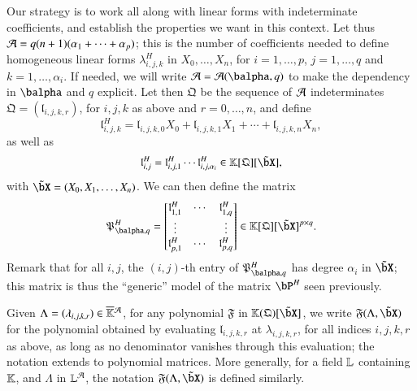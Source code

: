 \documentclass[amsthm]{elsart}
\begin{document}
Our strategy is to work all along with linear forms with indeterminate
coefficients, and establish the properties we want in this context.
Let thus ${\cal A}=q(n+1)(\alpha_1 + \cdots + \alpha_p)$; this is the
number of coefficients needed to define homogeneous linear forms
$\lambda^H_{i,j,k}$ in $X_0,\dots,X_n$, for $i=1,\dots,p$,
$j=1,\dots,q$ and $k=1,\dots,\alpha_i$. If needed, we will write
${\cal A}={\cal A}(\balpha,q)$ to make the dependency in $\balpha$ and
$q$ explicit.  Let then $\mathfrak{Q}$ be the sequence of ${\cal A}$
indeterminates $\mathfrak{Q}=(\mathfrak{l}_{i,j,k,r})$, for $i,j,k$ as
above and $r=0,\dots,n$, and define
$$\mathfrak{l}^H_{i,j,k} = \mathfrak{l}_{i,j,k,0}X_0 + \mathfrak{l}_{i,j,k,1} X_1 +\cdots + \mathfrak{l}_{i,j,k,n} X_n,$$
as well as 
$$\mathfrak{l}^H_{i,j} = \mathfrak{l}^H_{i,j,1} \cdots \mathfrak{l}^H_{i,j,\alpha_i} \in \KK[\mathfrak{Q}][\tilde\bX],$$
with $\tilde\bX=(X_0,X_1,\dots,X_n)$. We can then define the
matrix
\begin{align}\label{eq:matM}
\mathfrak{P}^H_{\balpha,q}=\left [\begin{matrix}
\mathfrak{l}^H_{1,1} & \cdots & \mathfrak{l}^H_{1,q}\\
 \vdots & & \vdots\\
\mathfrak{l}^H_{p,1} & \cdots & \mathfrak{l}^H_{p,q}
  \end{matrix}\right ]\in \KK[\mathfrak{Q}][\tilde\bX]^{p\times q}.  
\end{align}
Remark that for all $i,j$, the $(i,j)$-th entry of
$\mathfrak{P}^H_{\balpha,q}$ has degree $\alpha_i$ in $\tilde \bX$;
this matrix is thus the ``generic'' model of the matrix $\bP^H$ seen previously.

Given $\Lambda=(\lambda_{i,j,k,r})\in \KKbar{}^{\cal A}$, for any polynomial
$\mathfrak{F}$ in $\KK(\mathfrak{Q})[\tilde \bX]$, we write
$\mathfrak{F}(\Lambda,\tilde\bX)$ for the polynomial obtained by
evaluating $\mathfrak{l}_{i,j,k,r}$ at $\lambda_{i,j,k,r}$, for all
indices $i,j,k,r$ as above, as long as no denominator vanishes through
this evaluation; the notation extends to polynomial matrices. More
generally, for a field $\mathbb{L}$ containing $\mathbb{K}$, and $\Lambda$ in $\LL^{\cal A}$, the
notation $\mathfrak{F}(\Lambda,\tilde\bX)$ is defined similarly.
\end{document}
